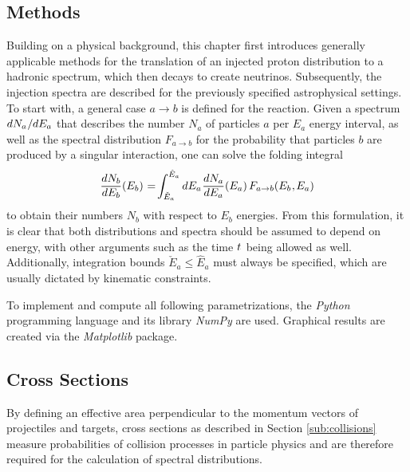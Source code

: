 \begin{spacing}{0.985}
	\chapter{Methods}
	\label{ch:methods}
	
	Building on a physical background, this chapter first introduces generally applicable methods for the translation of an
	injected proton distribution to a hadronic spectrum, which then decays to create neutrinos. Subsequently, the injection
	spectra are described for the previously specified astrophysical settings. To start with, a general case $a \rightarrow b$
	is defined for the reaction. Given a spectrum $dN_a \kern+0.5pt / \kern-0.25pt dE_a$ that describes the number $N_a$ of
	particles $a$ per $E_a$ energy interval, as well as the spectral distribution $F_{a \rightarrow b}$ for the probability
	that particles $b$ are produced by a singular interaction, one can solve the folding integral
	\begin{equation}
		\frac{dN_b}{\raisebox{0.5ex}{$dE_b$}} (E_b) \kern+0.5pt = \kern-1.5pt\int_{\check{E}_a}^{\hat{E}_a} dE_a
		\kern+0.5pt \frac{dN_a}{\raisebox{0.5ex}{$dE_a$}} (E_a) \kern+1.5pt F_{a \rightarrow b} (E_b \kern+0.5pt, \kern-0.5pt E_a)
		\label{eqn:folding}
	\end{equation}
	to obtain their numbers $N_b$ with respect to $E_b$ energies. From this formulation, it is clear that both distributions
	and spectra should be assumed to depend on energy, with other arguments such as the time $t \kern+0.5pt$ being allowed as
	well. Additionally, integration bounds $\check{E}_a \leq \hat{E}_a$ must always be specified, which are usually dictated by
	kinematic constraints.
	
	To implement and compute all following parametrizations, the \emph{Python} programming language and its library \emph{NumPy}
	are used. Graphical results are created via the \emph{Matplotlib} package.
	
	
	
	\section{Cross Sections}
	\label{sec:cross}
	
	By defining an effective area perpendicular to the momentum vectors of projectiles and targets, cross sections as described
	in Section \ref{sub:collisions} measure probabilities of collision processes in particle physics and are therefore required
	for the calculation of spectral distributions. 
	

\end{spacing}
